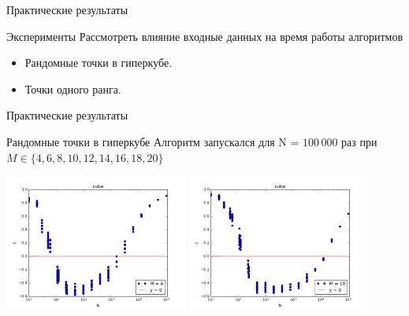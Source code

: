 \documentclass{beamer}
\begin{document}
\begin{frame}{Практические результаты}
\begin{block}{Эксперименты}
Рассмотреть влияние входные данных на время работы алгоритмов
\begin{itemize}
\item Рандомные точки в гиперкубе.
\item Точки одного ранга.
\end{itemize}
\end{block}
\end{frame}


\begin{frame}{Практические результаты}
\begin{block}{Рандомные точки в гиперкубе}
Алгоритм запускался для N = $100\,000$ раз при $M \in \{4, 6, 8, 10, 12, 14, 16, 18, 20\}$
\begin{table}[h]
\begin{center}
\includegraphics[width=6cm]{pic/cube_m=4}
\includegraphics[width=6cm]{pic/cube_m=10}
\end{center}
\end{table}
\end{block}
\end{frame}
\end{document}
